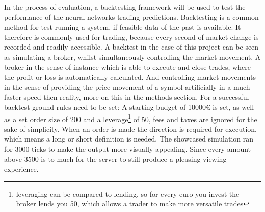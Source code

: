 \documentclass{article}
\begin{document}
In the process of evaluation, a backtesting framework will be used to test the performance of the neural networks trading predictions. Backtesting is a common method for test running a system, if feasible data of the past is available. It therefore is commonly used for trading, because every second of market change is recorded and readily accessible. A backtest in the case of this project can be seen as simulating a broker, whilst simultaneously controlling the market movement. A broker in the sense of instance which is able to execute and close trades, where the profit or loss is automatically calculated. And controlling market movements in the sense of providing the price movement of a symbol artificially in a much faster speed then reality, more on this in the methods section. For a successful backtest ground rules need to be set: A starting budget of 10000€ is set, as well as a set order size of 200 and a leverage\footnote{ leveraging can be compared to lending, so for every euro you invest the broker lends you 50, which allows a trader to make more versatile trades} of 50, fees and taxes are ignored for the sake of simplicity. When an order is made the direction is required for execution, which means a long or short definition is needed. The showcased simulation ran for 3000 ticks to make the output more visually appealing. Since every amount above 3500 is to much for the server to still produce a pleasing viewing experience. 

 
\end{document}
